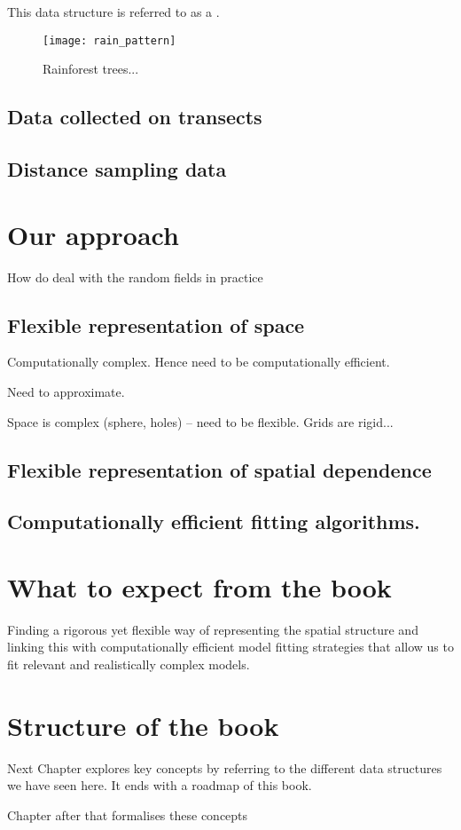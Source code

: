 This data structure is referred to as a \textit{}.
\begin{figure}
\centering
\texttt{[image: rain\_pattern]}
\caption{\label{fig:pattern} Rainforest trees...}
\end{figure}




\subsection{Data collected on transects}
\subsection{Distance sampling data}


\section{Our approach}

How do deal with the random fields in practice


\subsection{Flexible representation of space}

Computationally complex. Hence need to be computationally efficient.

Need to approximate.

Space is complex (sphere, holes) -- need to be flexible. Grids are rigid... 

\subsection{Flexible representation of spatial dependence}

\subsection{Computationally efficient fitting algorithms.}


\section{What to expect from the book}


Finding a rigorous yet flexible way of representing the spatial structure and linking this with computationally efficient model fitting strategies that allow us to fit relevant and realistically complex models.

\section{Structure of the book}

Next Chapter explores key concepts by referring to the different data structures we have seen here. It ends with a roadmap of this book.
 
Chapter after that formalises these concepts





